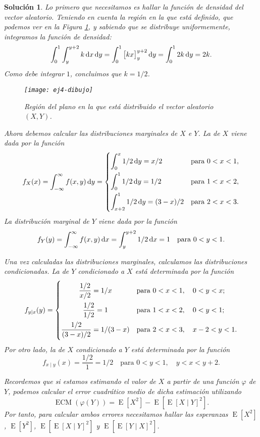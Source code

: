 \documentclass[
  a4paper,
  spanish,
  12pt,
]{scrartcl}
\theoremstyle{ejercicio-style}
\theoremstyle{remark-style}
\newtheorem*{sol}{Solución}
\begin{document}
\begin{sol}
  Lo primero que necesitamos es hallar la función de densidad del vector aleatorio. 
  Teniendo en cuenta la región en la que está definido, que podemos ver en la Figura \ref{fig:region}, y sabiendo que se distribuye uniformemente, integramos la función de densidad:
  \[
    \int_0^1\int_y^{y+2} k\dif x\dif y = \int_0^1 \big[kx\big]_{y}^{y+2} \dif y= \int_0^1 2k \dif y = 2k.
  \]
  Como debe integrar \(1\), concluimos que \(k = 1/2\).
  \begin{figure}[h]
    \centering
    \texttt{[image: ej4-dibujo]}
    \caption{Región del plano en la que está distribuido el vector aleatorio \((X,Y)\).}
    \label{fig:region}
  \end{figure}
  
  Ahora debemos calcular las distribuciones marginales de \(X\) e \(Y\). La de \(X\) viene dada por la función
  \[
    f_X(x) = \int_{-\infty}^{\infty} f(x,y) \dif y = \begin{dcases}
      \int_0^x 1/2 \dif y = x/2 & \text{para } 0 < x < 1,\\
      \int_0^1 1/2 \dif y = 1/2  & \text{para } 1 < x < 2,\\
      \int_{x+2}^1 1/2 \dif y = (3 - x)/2 & \text{para } 2 < x < 3.
    \end{dcases}
  \]
  La distribución marginal de \(Y\) viene dada por la función
  \[
    f_Y(y) = \int_{-\infty}^{\infty} f(x,y) \dif x = \int_y^{y+2} 1/2 \dif x = 1 \quad\text{para } 0 < y < 1.
  \]

  Una vez calculadas las distribuciones marginales, calculamos las distribuciones condicionadas. La de \(Y\) condicionado a \(X\) está determinada por la función
  \begin{align*}
    f_{y\mid x}(y) = \begin{dcases}
      \hfil\frac{1/2}{x/2} = 1/x & \text{para } 0 < x < 1,\quad 0 < y < x;\\
      \hfil\frac{1/2}{1/2} = 1  & \text{para } 1 < x < 2,\quad 0 < y < 1;\\
      \frac{1/2}{(3-x)/2} = 1/(3-x) & \text{para } 2 < x < 3,\quad x-2 < y < 1.
    \end{dcases}
  \end{align*}
  Por otro lado, la de \(X\) condicionado a \(Y\) está determinada por la función
  \[
    f_{x \mid y}(x) = \frac{1/2}{1} = 1/2 \quad\text{para } 0 < y < 1,\quad y < x < y+2.
  \]

  Recordemos que si estamos estimando el valor de \(X\) a partir de una función \(\varphi\) de \(Y\), podemos calcular el error cuadrático medio de dicha estimación utilizando
  \[
    \operatorname{ECM}(\varphi(Y)) = \operatorname{E}[X^2] - \operatorname{E}[\operatorname{E}[X\mid Y]^2].
  \]
  Por tanto, para calcular ambos errores necesitamos hallar las esperanzas \(\operatorname{E}[X^2]\), \(\operatorname{E}[Y^2]\), \(\operatorname{E}[\operatorname{E}[X \mid Y]^2]\) y \(\operatorname{E}[\operatorname{E}[Y \mid X]^2]\).


\end{sol}
\end{document}
